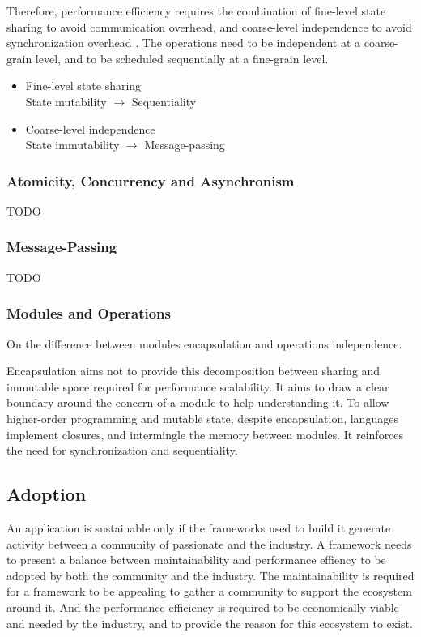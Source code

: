 Therefore, performance efficiency requires the combination of fine-level state sharing to avoid communication overhead, and coarse-level independence to avoid synchronization overhead \cite{Gustafson1988,Gunther1996,Nelson1996,Gunther2002}.
The operations need to be independent at a coarse-grain level, and to be scheduled sequentially at a fine-grain level.

\begin{itemize}
\item Fine-level state sharing\\
  \subitem State mutability
  \subitem $\to$ Sequentiality
\item Coarse-level independence\\
  \subitem State immutability
  \subitem $\to$ Message-passing
\end{itemize}

\subsubsection{Atomicity, Concurrency and Asynchronism}
TODO

\subsubsection{Message-Passing}
TODO


\subsubsection{Modules and Operations}

On the difference between modules encapsulation and operations independence.

Encapsulation aims not to provide this decomposition between sharing and immutable space required for performance scalability.
It aims to draw a clear boundary around the concern of a module to help understanding it.
To allow higher-order programming and mutable state, despite encapsulation, languages implement closures, and intermingle the memory between modules.
It reinforces the need for synchronization and sequentiality.






\subsection{Adoption}

An application is sustainable only if the frameworks used to build it generate activity between a community of passionate and the industry.
A framework needs to present a balance between maintainability and performance effiency to be adopted by both the community and the industry.
The maintainability is required for a framework to be appealing to gather a community to support the ecosystem around it.
And the performance efficiency is required to be economically viable and needed by the industry, and to provide the reason for this ecosystem to exist.

